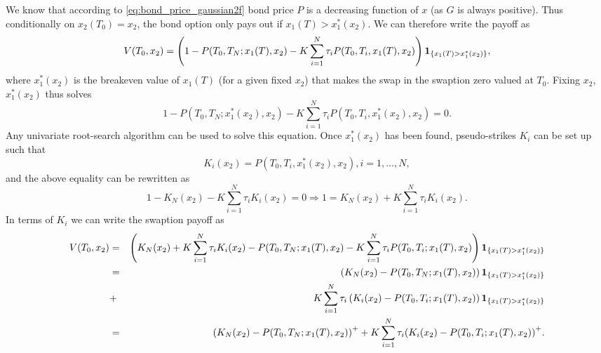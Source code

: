 \documentclass[11pt,a4paper]{article}
\numberwithin{equation}{section}
\begin{document}
We know that according to \eqref{eq:bond_price_gaussian2f} bond price $P$ is a decreasing function of $x$ (as $G$ is always positive). Thus conditionally on $x_2(T_0)=x_2$, the bond option only pays out if ${{x_1}(T) > x_1^*({x_2})}$. We can therefore write the payoff as 
\begin{equation*}
  V({T_0},{x_2}) = \left( {1 - P({T_0},{T_N};{x_1}(T),{x_2}) - K\sum\limits_{i = 1}^N {{\tau _i}P({T_0},{T_i},{x_1}(T),{x_2})} } \right){{\bf{1}}_{\{ {x_1}(T) > x_1^*({x_2})\} }},
\end{equation*}
where $x_1^*({x_2})$ is the breakeven value of $x_1(T)$ (for a given fixed $x_2$) that makes the swap in the swaption zero valued at $T_0$. Fixing $x_2$, $x_1^*({x_2})$ thus solves
\begin{equation*}
  1 - P({T_0},{T_N};x_1^*({x_2}),{x_2}) - K\sum\limits_{i = 1}^N {{\tau _i}P({T_0},{T_i},x_1^*({x_2}),{x_2})}  = 0.
\end{equation*}
Any univariate root-search algorithm can be used to solve this equation. Once $x_1^*({x_2})$ has been found, pseudo-strikes $K_i$ can be set up such that 
\begin{equation*}
  {K_i}({x_2}) = P({T_0},{T_i},x_1^*({x_2}),{x_2}),i = 1,...,N, 
\end{equation*}
and the above equality can be rewritten as
\begin{equation*}
  1 - {K_N}({x_2}) - K\sum\limits_{i = 1}^N {{\tau _i}{K_i}({x_2})}  = 0 \Rightarrow 1 = {K_N}({x_2}) + K\sum\limits_{i = 1}^N {{\tau _i}{K_i}({x_2})}.
\end{equation*}
In terms of $K_i$ we can write the swaption payoff as
\small
\begin{eqnarray*}
V({T_0},{x_2}) &=& \left( {{K_N}({x_2}) + K\sum\limits_{i = 1}^N {{\tau _i}{K_i}({x_2})}  - P({T_0},{T_N};{x_1}(T),{x_2}) - K\sum\limits_{i = 1}^N {{\tau _i}P({T_0},{T_i};{x_1}(T),{x_2})} } \right){{\bf{1}}_{\{ {x_1}(T) > x_1^*({x_2})\} }}\\
 &=& \left( {{K_N}({x_2}) - P({T_0},{T_N};{x_1}(T),{x_2})} \right){{\bf{1}}_{\{ {x_1}(T) > x_1^*({x_2})\} }} \\
&+& K\sum\limits_{i = 1}^N {{\tau _i}\left( {{K_i}({x_2}) - P({T_0},{T_i};{x_1}(T),{x_2})} \right){{\bf{1}}_{\{ {x_1}(T) > x_1^*({x_2})\} }}} \\
 &=& {\left( {{K_N}({x_2}) - P({T_0},{T_N};{x_1}(T),{x_2})} \right)^ + } + K\sum\limits_{i = 1}^N {{\tau _i}{{\left( {{K_i}({x_2}) - P({T_0},{T_i};{x_1}(T),{x_2})} \right)}^ + }}.
\end{eqnarray*}
\normalsize
\end{document}
